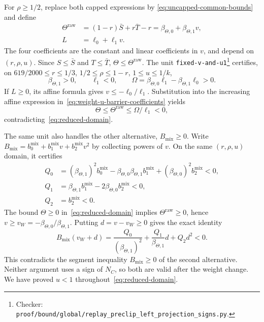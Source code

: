 \documentclass[11pt]{article}
\theoremstyle{remark}
\theoremstyle{plain}
\begin{document}
For $\rho\ge1/2$, replace both capped expressions by
\eqref{eq:uncapped-common-bounds} and define
\begin{equation}
 \begin{aligned}
 \Theta^{\mathrm{raw}}
    &=(1-r)\bar S+r\bar T-r
      =\beta_{\Theta,0}+\beta_{\Theta,1}v,\\
 L&=\ell_0+\ell_1v.
 \end{aligned}
 \label{eq:weight-u-barrier-coefficients}
\end{equation}
The four coefficients are the constant and linear coefficients in
$v$, and depend on $(r,\rho,u)$. Since $S\le\bar S$ and $T\le\bar T$,
$\Theta\le \Theta^{\mathrm{raw}}$.
The unit \nolinkurl{fixed-v-and-u1}\footnote{Checker:
\nolinkurl{proof/bound/global/replay_preclip_left_projection_signs.py}.\label{fn:checker-fixed-v-and-u1}} certifies, on
$619/2000\le r\le1/3$, $1/2\le\rho\le1-r$, $1\le u\le1/k$,
\begin{equation}
 \beta_{\Theta,1}>0,\qquad \ell_1<0,\qquad
 \Omega=\beta_{\Theta,0}\ell_1
                  -\beta_{\Theta,1}\ell_0>0.
 \label{eq:weight-left-u-barrier}
\end{equation}
If $L\ge0$, its affine formula gives $v\le-\ell_0/\ell_1$.
Substitution into the increasing affine expression
in~\eqref{eq:weight-u-barrier-coefficients} yields
\[
 \Theta\le \Theta^{\mathrm{raw}}
       \le\Omega/\ell_1<0,
\]
contradicting~\eqref{eq:reduced-domain}.

The same unit also handles the other alternative,
$B_{\mathrm{mix}}\ge0$. Write
$B_{\mathrm{mix}}=b_0^{\mathrm{mix}}+
b_1^{\mathrm{mix}}v+b_2^{\mathrm{mix}}v^2$ by collecting powers of $v$.
On the same $(r,\rho,u)$ domain, it certifies
\begin{equation}
 \begin{aligned}
 Q_0&=(\beta_{\Theta,1})^2b_0^{\mathrm{mix}}
   -\beta_{\Theta,0}\beta_{\Theta,1}b_1^{\mathrm{mix}}
   +(\beta_{\Theta,0})^2b_2^{\mathrm{mix}}<0,\\
 Q_1&=\beta_{\Theta,1}b_1^{\mathrm{mix}}
                    -2\beta_{\Theta,0}b_2^{\mathrm{mix}}<0,\\
 Q_2&=b_2^{\mathrm{mix}}<0.
 \end{aligned}
 \label{eq:weight-opposite-u-barrier}
\end{equation}
The bound $\Theta\ge0$ in~\eqref{eq:reduced-domain}
implies $\Theta^{\mathrm{raw}}\ge0$, hence
$v\ge v_W=-\beta_{\Theta,0}/\beta_{\Theta,1}$.
Putting $d=v-v_W\ge0$ gives the exact identity
\[
 B_{\mathrm{mix}}(v_W+d)
   =\frac{Q_0}{(\beta_{\Theta,1})^2}
        +\frac{Q_1}{\beta_{\Theta,1}}d+Q_2d^2<0.
\]
This contradicts the segment inequality $B_{\mathrm{mix}}\ge0$ of
the second alternative. Neither argument
uses a sign of $N_C$, so both are valid after the weight change.
We have proved $u<1$ throughout~\eqref{eq:reduced-domain}.
\end{document}
